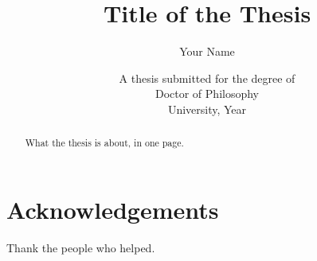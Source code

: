 \documentclass[11pt,a4paper,oneside]{report}
\title{Title of the Thesis}
\author{Your Name}
\date{A thesis submitted for the degree of\\Doctor of Philosophy\\[1em]University, Year}
\begin{document}
\maketitle

\begin{abstract}
What the thesis is about, in one page.
\end{abstract}

\chapter*{Acknowledgements}
Thank the people who helped.

\tableofcontents
\listoffigures
\listoftables






\appendix




\end{document}

